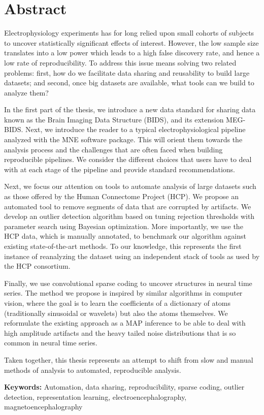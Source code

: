\chapter*{Abstract}

Electrophysiology experiments has for long relied upon small cohorts of subjects to uncover statistically significant effects of interest. However, the low sample size translates into a low power which leads to a high false discovery rate, and hence a low rate of reproducibility. To address this issue means solving two related problems: first, how do we  facilitate data sharing and reusability to build large datasets; and second, once big datasets are available, what tools can we build to analyze them?

In the first part of the thesis, we introduce a new data standard for sharing data known as the Brain Imaging Data Structure (BIDS), and its extension MEG-BIDS. Next, we introduce the reader to a typical electrophysiological pipeline analyzed with the MNE software package. This will orient them towards the analysis process and the challenges that are often faced when building reproducible pipelines. We consider the different choices that users have to deal with at each stage of the pipeline and provide standard recommendations.

Next, we focus our attention on tools to automate analysis of large datasets such as those offered by the Human Connectome Project (HCP). We propose an automated tool to remove segments of data that are corrupted by artifacts. We develop an outlier detection algorithm based on tuning rejection thresholds with parameter search using Bayesian optimization. More importantly, we use the HCP data, which is manually annotated, to benchmark our algorithm against existing state-of-the-art methods. To our knowledge, this represents the first instance of reanalyzing the dataset using an independent stack of tools as used by the HCP consortium.

Finally, we use convolutional sparse coding to uncover structures in neural time series. The method we propose is inspired by similar algorithms in computer vision, where the goal is to learn the coefficients of a dictionary of atoms (traditionally sinusoidal or wavelets) but also the atoms themselves. We reformulate the existing approach as a \ac{MAP} inference to be able to deal with high amplitude artifacts and the heavy tailed noise distributions that is so common in neural time series. 

Taken together, this thesis represents an attempt to shift from slow and manual methods of analysis to automated, reproducible analysis.

\textbf{Keywords:} Automation, data sharing, reproducibility, sparse coding, outlier detection, representation learning, electroencephalography, magnetoencephalography